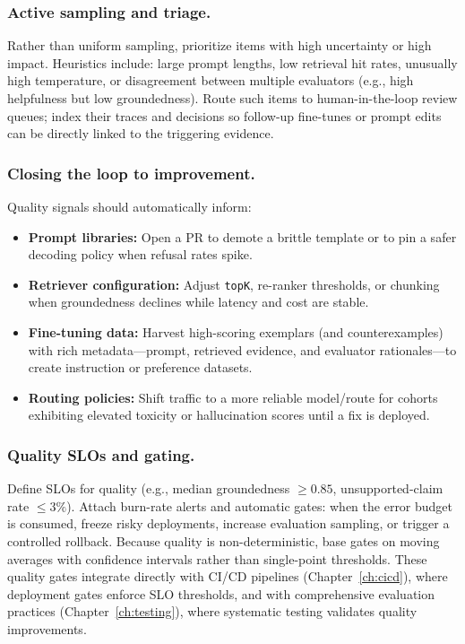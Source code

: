 \subsubsection{Active sampling and triage.}
Rather than uniform sampling, prioritize items with high uncertainty or high impact. Heuristics include: large prompt lengths, low retrieval hit rates, unusually high temperature, or disagreement between multiple evaluators (e.g., high helpfulness but low groundedness). Route such items to human-in-the-loop review queues; index their traces and decisions so follow-up fine-tunes or prompt edits can be directly linked to the triggering evidence.

\subsubsection{Closing the loop to improvement.}
Quality signals should automatically inform:
\begin{itemize}[leftmargin=1.2em]
\item \textbf{Prompt libraries:} Open a PR to demote a brittle template or to pin a safer decoding policy when refusal rates spike.
\item \textbf{Retriever configuration:} Adjust \texttt{topK}, re-ranker thresholds, or chunking when groundedness declines while latency and cost are stable.
\item \textbf{Fine-tuning data:} Harvest high-scoring exemplars (and counterexamples) with rich metadata—prompt, retrieved evidence, and evaluator rationales—to create instruction or preference datasets.
\item \textbf{Routing policies:} Shift traffic to a more reliable model/route for cohorts exhibiting elevated toxicity or hallucination scores until a fix is deployed.
\end{itemize}

\subsubsection{Quality SLOs and gating.}
Define SLOs for quality (e.g., median groundedness $\ge 0.85$, unsupported-claim rate $\le 3\%$). Attach burn-rate alerts and automatic gates: when the error budget is consumed, freeze risky deployments, increase evaluation sampling, or trigger a controlled rollback. Because quality is non-deterministic, base gates on moving averages with confidence intervals rather than single-point thresholds. These quality gates integrate directly with CI/CD pipelines (Chapter~\ref{ch:cicd}), where deployment gates enforce SLO thresholds, and with comprehensive evaluation practices (Chapter~\ref{ch:testing}), where systematic testing validates quality improvements.

